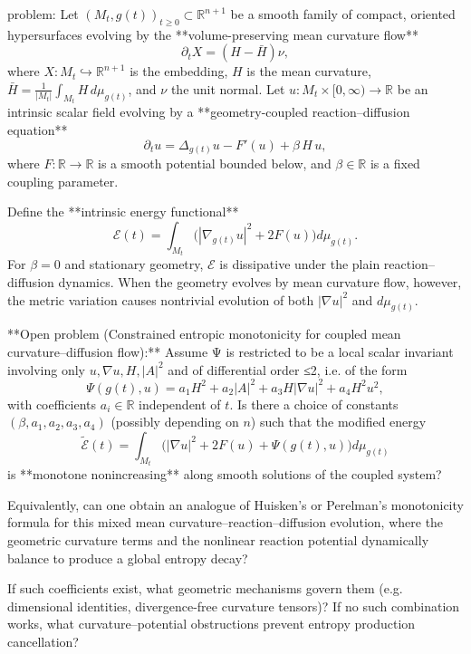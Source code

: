 problem:  
Let \((M_t,g(t))_{t\ge0}\subset \mathbb{R}^{n+1}\) be a smooth family of compact, oriented hypersurfaces evolving by the **volume-preserving mean curvature flow**
\[
\partial_t X = (H - \bar H)\nu,
\]
where \(X:M_t\hookrightarrow\mathbb{R}^{n+1}\) is the embedding, \(H\) is the mean curvature, \(\bar H=\frac{1}{|M_t|}\int_{M_t}H\,d\mu_{g(t)}\), and \(\nu\) the unit normal.  
Let \(u:M_t\times[0,\infty)\to\mathbb{R}\) be an intrinsic scalar field evolving by a **geometry-coupled reaction–diffusion equation**
\[
\partial_t u = \Delta_{g(t)}u - F'(u) + \beta\,H\,u,
\]
where \(F:\mathbb{R}\to\mathbb{R}\) is a smooth potential bounded below, and \(\beta\in\mathbb{R}\) is a fixed coupling parameter.

Define the **intrinsic energy functional**
\[
\mathcal{E}(t)=\int_{M_t}\!\big(|\nabla_{g(t)}u|^2+2F(u)\big)d\mu_{g(t)}.
\]
For \(\beta=0\) and stationary geometry, \(\mathcal{E}\) is dissipative under the plain reaction–diffusion dynamics.  
When the geometry evolves by mean curvature flow, however, the metric variation causes nontrivial evolution of both \(|\nabla u|^2\) and \(d\mu_{g(t)}\).

**Open problem (Constrained entropic monotonicity for coupled mean curvature–diffusion flow):**  
Assume Ψ is restricted to be a local scalar invariant involving only \(u,\nabla u,H,|A|^2\) and of differential order ≤2, i.e. of the form
\[
\Psi(g(t),u)=a_1H^2+a_2|A|^2+a_3H|\nabla u|^2+a_4H^2u^2,
\]
with coefficients \(a_i\in\mathbb{R}\) independent of \(t\).  
Is there a choice of constants \((\beta,a_1,a_2,a_3,a_4)\) (possibly depending on \(n\)) such that the modified energy
\[
\widetilde{\mathcal{E}}(t)=\int_{M_t}\!\big(|\nabla u|^2+2F(u)+\Psi(g(t),u)\big)d\mu_{g(t)}
\]
is **monotone nonincreasing** along smooth solutions of the coupled system?

Equivalently, can one obtain an analogue of Huisken’s or Perelman’s monotonicity formula for this mixed mean curvature–reaction–diffusion evolution, where the geometric curvature terms and the nonlinear reaction potential dynamically balance to produce a global entropy decay?

If such coefficients exist, what geometric mechanisms govern them (e.g. dimensional identities, divergence-free curvature tensors)?  If no such combination works, what curvature–potential obstructions prevent entropy production cancellation?

